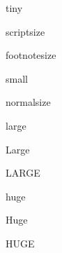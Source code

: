 \NewDocumentCommand \tiny {}
  { {tiny}}

\NewDocumentCommand \scriptsize {}
  { {scriptsize}}

\NewDocumentCommand \footnotesize {}
  { {footnotesize}}

\NewDocumentCommand \small {}
  { {small}}

\RenewDocumentCommand \normalsize {}
  { {normalsize}}

\NewDocumentCommand \large {}
  { {large}}

\NewDocumentCommand \Large {}
  { {Large}}

\NewDocumentCommand \LARGE {}
  { {LARGE}}

\NewDocumentCommand \huge {}
  { {huge}}

\NewDocumentCommand \Huge {}
  { {Huge}}

\NewDocumentCommand \HUGE {}
  { {HUGE}}
